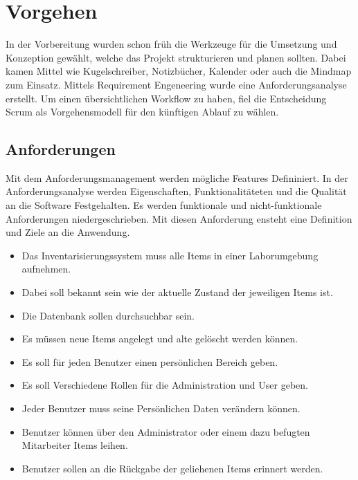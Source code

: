 \chapter{Vorgehen}
In der Vorbereitung wurden schon früh die Werkzeuge für die Umsetzung und Konzeption gewählt, welche das Projekt strukturieren und planen sollten. Dabei kamen Mittel wie Kugelschreiber, Notizbücher, Kalender oder auch die Mindmap zum Einsatz. Mittels Requirement Engeneering wurde eine Anforderungsanalyse erstellt. Um einen übersichtlichen Workflow zu haben, fiel die Entscheidung Scrum als Vorgehensmodell für den künftigen Ablauf zu wählen.



\section{Anforderungen}

Mit dem Anforderungsmanagement werden mögliche Features Defininiert. In der Anforderungsanalyse werden Eigenschaften, Funktionalitäteten und die Qualität an die Software Festgehalten. \autocite{Grande.2014} Es werden funktionale und nicht-funktionale Anforderungen niedergeschrieben. Mit diesen Anforderung ensteht eine Definition und Ziele an die Anwendung.

\begin{itemize}
\item Das Inventarisierungssystem muss alle Items in einer Laborumgebung aufnehmen. 

\item Dabei soll bekannt sein wie der aktuelle Zustand der jeweiligen Items ist. 

\item Die Datenbank sollen durchsuchbar sein. 

\item Es müssen neue Items angelegt und alte gelöscht werden können. 

\item Es soll für jeden Benutzer einen persönlichen Bereich geben. 

\item Es soll Verschiedene Rollen für die Administration und User geben.

\item Jeder Benutzer muss seine Persönlichen Daten verändern können.

\item Benutzer können über den Administrator oder einem dazu befugten Mitarbeiter Items leihen.

\item Benutzer sollen an die Rückgabe der geliehenen Items erinnert werden.


\end{itemize}

